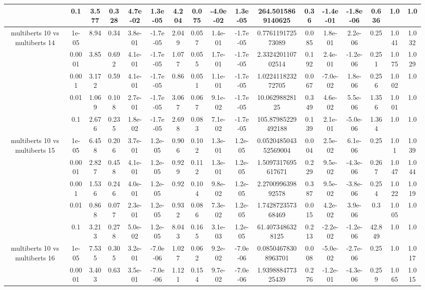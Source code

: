 \begin{tabular}{|c|c|c|c|c|c|c|c|c|c|c|c|c|c|c|c|c|}
 & 0.1 & 3.577 & 0.328 & 4.7e-02 & 1.3e-05 & 4.204 & 0.075 & -4.0e-02 & 1.3e-05 & 264.5015869140625 & 0.36 & -1.4e-01 & -1.8e-06 & 0.636 & 1.0 & 1.0 \\
\hline
\multirow{5}{*}{multiberts 10 vs multiberts 14} & 1e-05 & 8.94 & 0.34 & 3.8e-01 & -1.7e-05 & 2.049 & 0.057 & 1.4e-01 & -1.7e-05 & 0.776119172573089 & 0.085 & 1.8e-01 & 2.2e-06 & 0.25 & 1.041 & 1.032 \\
 & 0.0001 & 3.85 & 0.692 & 4.1e-01 & -1.7e-05 & 1.077 & 0.055 & 1.7e-01 & -1.7e-05 & 2.332420110702514 & 0.192 & 2.4e-01 & -1.2e-06 & 0.251 & 1.075 & 1.029 \\
 & 0.001 & 3.172 & 0.59 & 4.1e-01 & -1.7e-05 & 0.86 & 0.051 & 1.1e-01 & -1.7e-05 & 1.022411823272705 & 0.067 & -7.0e-02 & 1.8e-06 & 0.256 & 1.002 & 1.0 \\
 & 0.01 & 1.069 & 0.108 & 2.7e-01 & -1.7e-05 & 3.067 & 0.067 & 9.1e-02 & -1.7e-05 & 10.06298828125 & 0.349 & 4.6e-02 & 5.5e-06 & 1.356 & 1.001 & 1.0 \\
 & 0.1 & 2.676 & 0.235 & 1.8e-02 & -1.7e-05 & 2.698 & 0.083 & 7.1e-02 & -1.7e-05 & 105.87985229492188 & 0.139 & 2.1e-01 & -5.0e-06 & 1.364 & 1.0 & 1.0 \\
\hline
\multirow{5}{*}{multiberts 10 vs multiberts 15} & 1e-05 & 6.458 & 0.206 & 3.7e-01 & 1.2e-05 & 0.906 & 0.102 & 1.3e-01 & 1.2e-05 & 0.052048504352569004 & 0.004 & 2.5e-02 & 6.1e-06 & 0.25 & 1.01 & 1.039 \\
 & 0.0001 & 2.827 & 0.458 & 4.1e-01 & 1.2e-05 & 0.929 & 0.112 & 1.3e-01 & 1.2e-05 & 1.5097317695617671 & 0.229 & 9.5e-02 & -4.3e-06 & 0.267 & 1.047 & 1.044 \\
 & 0.001 & 1.536 & 0.246 & 4.0e-01 & 1.2e-05 & 0.92 & 0.104 & 9.8e-02 & 1.2e-05 & 2.270099639892578 & 0.387 & 9.5e-02 & -3.8e-06 & 0.254 & 1.022 & 1.019 \\
 & 0.01 & 0.868 & 0.077 & 2.3e-01 & 1.2e-05 & 0.932 & 0.086 & 7.3e-02 & 1.2e-05 & 1.742872357368469 & 0.015 & 4.2e-02 & 3.9e-06 & 0.3 & 1.005 & 1.0 \\
 & 0.1 & 3.213 & 0.278 & 5.0e-02 & 1.2e-05 & 8.043 & 0.165 & 3.1e-03 & 1.2e-05 & 61.4073486328125 & 0.213 & -2.2e-02 & -1.2e-06 & 42.849 & 1.0 & 1.0 \\
\hline
\multirow{5}{*}{multiberts 10 vs multiberts 16} & 1e-05 & 7.535 & 0.305 & 3.2e-01 & -7.0e-06 & 1.027 & 0.062 & 9.2e-02 & -7.0e-06 & 0.08504678308963701 & 0.008 & -5.0e-02 & -2.7e-06 & 0.25 & 1.0 & 1.017 \\
 & 0.0001 & 3.403 & 0.63 & 3.5e-01 & -7.0e-06 & 1.121 & 0.154 & 9.7e-02 & -7.0e-06 & 1.939888477325439 & 0.276 & -1.2e-01 & -4.3e-06 & 0.259 & 1.065 & 1.015 \\

\end{tabular}
